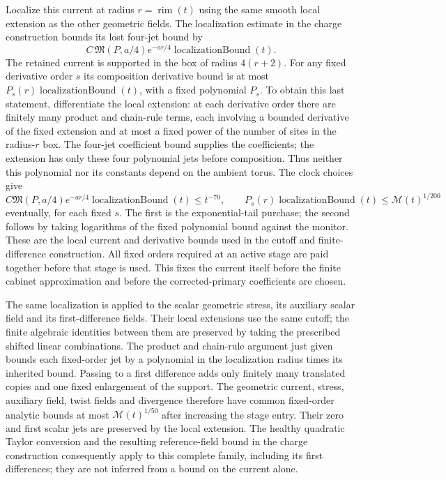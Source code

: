 Localize this current at radius $r=\operatorname{rim}(t)$ using the
same smooth local extension as the other geometric fields. The
localization estimate in the charge construction bounds its lost
four-jet bound by
\[
 C\,\mathfrak M(P,a/4)
                 e^{-ar/4}\operatorname{localizationBound}(t).
\]
The retained current is supported in the box of radius $4(r+2)$.
For any fixed derivative order $s$ its composition derivative bound is
at most $P_s(r)\operatorname{localizationBound}(t)$, with a fixed polynomial
$P_s$. To obtain this last statement, differentiate the local extension:
at each derivative order there are finitely many product and chain-rule
terms, each involving a bounded derivative of the fixed extension and
at most a fixed power of the number of sites in the radius-$r$ box.
The four-jet coefficient bound supplies the coefficients; the extension
has only these four polynomial jets before composition. Thus neither
this polynomial nor its constants depend on the ambient torus.
The clock choices give
\[
 C\mathfrak M(P,a/4)e^{-ar/4}
                    \operatorname{localizationBound}(t)\le t^{-70},\qquad
 P_s(r)\operatorname{localizationBound}(t)\le\mathcal M(t)^{1/200}
\]
eventually, for each fixed $s$. The first is the exponential-tail
purchase; the second follows by taking logarithms of the fixed
polynomial bound against the monitor. These are the local current and
derivative bounds used in the cutoff and finite-difference construction.
All fixed orders required at an active stage are paid together before
that stage is used. This fixes the current itself before the finite
cabinet approximation and before the corrected-primary coefficients
are chosen.


The same localization is applied to the scalar geometric stress, its
auxiliary scalar field and its first-difference fields. Their local
extensions use the same cutoff; the finite algebraic identities between
them are preserved by taking the prescribed shifted linear combinations.
The product and chain-rule argument just given bounds each fixed-order
jet by a polynomial in the localization radius times its inherited
bound. Passing to a first difference adds only finitely many translated
copies and one fixed enlargement of the support. The geometric current,
stress, auxiliary field, twist fields and divergence therefore have
common fixed-order analytic bounds at most $\mathcal M(t)^{1/50}$
after increasing the stage entry. Their zero and first scalar jets are
preserved by the local extension. The healthy quadratic Taylor
conversion and the resulting reference-field bound in the charge
construction consequently apply to this complete family, including its
first differences; they are not inferred from a bound on the current
alone.
